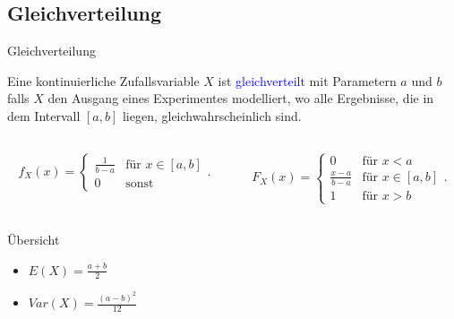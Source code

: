 \documentclass{beamer}
\def\padding{\vspace{0.5cm}}
\def\b{\textcolor{blue}}
\begin{document}
\subsection{Gleichverteilung}
\begin{frame}{Gleichverteilung}
    \begin{definition}
        Eine kontinuierliche Zufallsvariable $X$ ist \b{gleichverteilt} mit Parametern $a$ und $b$ falls $X$ den Ausgang eines Experimentes modelliert, wo alle Ergebnisse, die in dem Intervall $[a,b]$ liegen, gleichwahrscheinlich sind.\pause
        \begin{columns}
            \begin{column}{0.5\textwidth}
               \begin{align*}
                    f_X(x) = \begin{cases}
                        \frac{1}{b - a} & \text{für $x \in [a,b]$} \\
                        0 & \text{sonst}
                    \end{cases}.
                \end{align*}
            \end{column}\pause
            \begin{column}{0.5\textwidth}
                \begin{align*}
                    F_X(x) = \begin{cases}
                        0 & \text{für $x < a$} \\
                        \frac{x - a}{b - a} & \text{für $x \in [a,b]$} \\
                        1 & \text{für $x > b$}
                    \end{cases}.
                \end{align*}
            \end{column}
        \end{columns}\pause\par\padding
        \begin{exampleblock}{Übersicht}
            \begin{itemize}
                \item $E(X) = \frac{a + b}{2}$\pause
                \item $Var(X) = \frac{(a - b)^2}{12}$
            \end{itemize}
        \end{exampleblock}
    \end{definition}
\end{frame}
\end{document}
